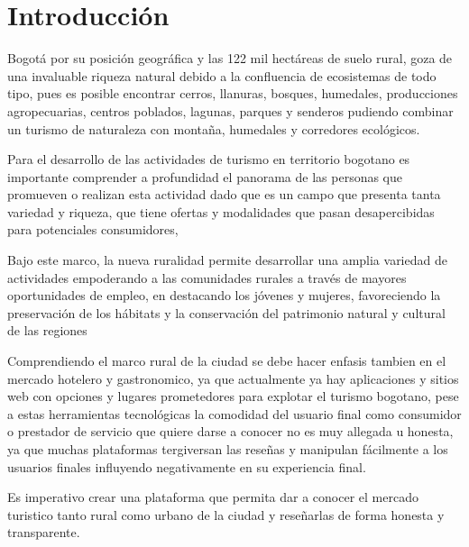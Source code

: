 \section{Introducción}
Bogotá por su posición geográfica y las 122 mil hectáreas de suelo rural, goza de una invaluable riqueza natural debido a la confluencia de ecosistemas de todo tipo, pues es posible encontrar cerros, llanuras, bosques, humedales, producciones agropecuarias, centros poblados, lagunas, parques y senderos pudiendo combinar un turismo de naturaleza con montaña, humedales y corredores ecológicos. 
~\cite{EstudioTurismoenterritoriosruralesdeBogotá}

Para el desarrollo de las actividades de turismo en territorio bogotano es importante comprender a profundidad el panorama de las personas que promueven o realizan esta actividad dado que es un campo que presenta tanta variedad y riqueza, que tiene ofertas y modalidades que pasan desapercibidas para potenciales consumidores,   

Bajo este marco, la nueva ruralidad permite desarrollar una amplia variedad de actividades empoderando a las comunidades rurales a través de mayores oportunidades de empleo, en destacando los jóvenes y mujeres, favoreciendo la preservación de los hábitats y la conservación del patrimonio natural y cultural de las regiones~\cite{EstudioTurismoenterritoriosruralesdeBogotá} 

Comprendiendo el marco rural de la ciudad se debe hacer enfasis tambien en el mercado hotelero y gastronomico, ya que actualmente ya hay aplicaciones y sitios web con opciones y lugares prometedores para explotar el turismo bogotano, pese a estas herramientas tecnológicas la comodidad del usuario final como consumidor o prestador de servicio que quiere darse a conocer no es muy allegada u honesta, ya que muchas plataformas tergiversan las reseñas y manipulan fácilmente a los usuarios finales influyendo negativamente en su experiencia final. 

Es imperativo crear una plataforma que permita dar a conocer el mercado turistico tanto rural como urbano de la ciudad y reseñarlas de forma honesta y transparente. 